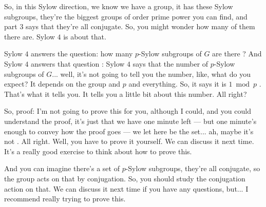 \begin{speech}[00:40:20 - 00:41:47]
So, in this Sylow direction, we know we have a group, it has these Sylow subgroups, they're the biggest groups of order prime power you can find, and part $3$ says that they're all conjugate. So, you might wonder how many of them there are. Sylow $4$ is about that.

Sylow $4$ answers the question: how many $p$-Sylow subgroups of $G$ are there ? And Sylow $4$ answers that question : Sylow $4$ says that the number of $p$-Sylow subgroups of $G$... well, it's not going to tell you the number, like, what do you expect? It depends on the group and $p$ and everything. So, it says it is $1 \bmod p$ . That's what it tells you. It tells you a little bit about this number. All right?
\end{speech}

\begin{content}

\end{content}

\begin{speech}[00:41:47 - 00:42:30]
So, proof: I'm not going to prove this for you, although I could, and you could understand the proof, it's just that we have one minute left --- but one minute's enough to convey how the proof goes --- we let here be the set... ah, maybe it's not . All right. Well, you have to prove it yourself. We can discuss it next time. It's a really good exercise to think about how to prove this.

And you can imagine there's a set of $p$-Sylow subgroups, they're all conjugate, so the group acts on that by conjugation. So, you should study the conjugation action on that. We can discuss it next time if you have any questions, but... I recommend really trying to prove this.
\end{speech}

